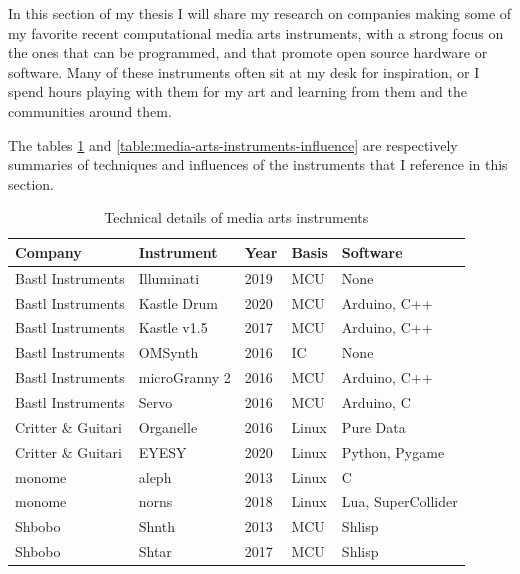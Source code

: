In this section of my thesis I will share my research on companies making some of my favorite recent computational media arts instruments, with a strong focus on the ones that can be programmed, and that promote open source hardware or software. Many of these instruments often sit at my desk for inspiration, or I spend hours playing with them for my art and learning from them and the communities around them.

The tables \ref{table:media-arts-instruments-technical} and \ref{table:media-arts-instruments-influence} are respectively summaries of techniques and influences of the instruments that I reference in this section.

\begin{table}[ht]
    \centering
    \begin{tabular}{ | l |  l | l | l | l |}
        \hline
        \textbf{Company} & \textbf{Instrument} & \textbf{Year} & \textbf{Basis} & \textbf{Software} \\
        \hline
        Bastl Instruments   & Illuminati    & 2019  & MCU       & None                \\
        \hline
        Bastl Instruments   & Kastle Drum   & 2020  & MCU       & Arduino, C++        \\
        \hline
        Bastl Instruments   & Kastle v1.5   & 2017  & MCU       & Arduino, C++        \\
        \hline
        Bastl Instruments   & OMSynth       & 2016  & IC        & None                \\
        \hline
        Bastl Instruments   & microGranny 2 & 2016  & MCU       & Arduino, C++        \\
        \hline
        Bastl Instruments   & Servo         & 2016  & MCU       & Arduino, C          \\
        \hline
        Critter \& Guitari  & Organelle     & 2016  & Linux     & Pure Data           \\
        \hline
        Critter \& Guitari  & EYESY         & 2020  & Linux     & Python, Pygame      \\
        \hline
        monome              & aleph         & 2013  & Linux     & C                   \\
        \hline
        monome              & norns         & 2018  & Linux     & Lua, SuperCollider  \\
        \hline
        Shbobo              & Shnth         & 2013  & MCU       & Shlisp              \\
        \hline
        Shbobo              & Shtar         & 2017  & MCU       & Shlisp              \\
        \hline
    \end{tabular}
    \caption{Technical details of media arts instruments}
    \label{table:media-arts-instruments-technical}
\end{table}{}

